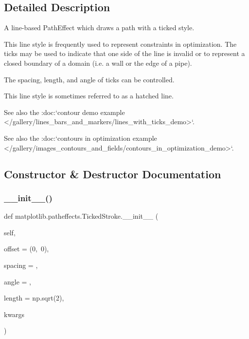 \subsection{Detailed Description}
\begin{DoxyVerb}A line-based PathEffect which draws a path with a ticked style.

This line style is frequently used to represent constraints in
optimization.  The ticks may be used to indicate that one side
of the line is invalid or to represent a closed boundary of a
domain (i.e. a wall or the edge of a pipe).

The spacing, length, and angle of ticks can be controlled.

This line style is sometimes referred to as a hatched line.

See also the :doc:`contour demo example
</gallery/lines_bars_and_markers/lines_with_ticks_demo>`.

See also the :doc:`contours in optimization example
</gallery/images_contours_and_fields/contours_in_optimization_demo>`.
\end{DoxyVerb}
 

\subsection{Constructor \& Destructor Documentation}
\mbox{\label{classmatplotlib_1_1patheffects_1_1TickedStroke_aa306391297e13180c8df34f4b4c97fad}} 
\subsubsection{\texorpdfstring{\+\_\+\+\_\+init\+\_\+\+\_\+()}{\_\_init\_\_()}}
{\footnotesize\ttfamily def matplotlib.\+patheffects.\+Ticked\+Stroke.\+\_\+\+\_\+init\+\_\+\+\_\+ (\begin{DoxyParamCaption}\item[{}]{self,  }\item[{}]{offset = {\ttfamily (0,~0)},  }\item[{}]{spacing = {},  }\item[{}]{angle = {},  }\item[{}]{length = {\ttfamily np.sqrt(2)},  }\item[{}]{kwargs }\end{DoxyParamCaption})}

